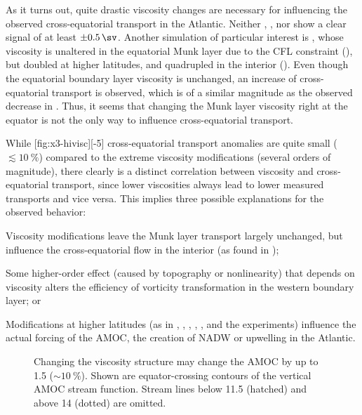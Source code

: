 As it turns out, quite drastic viscosity changes are necessary for influencing the observed cross-equatorial transport in the Atlantic. Neither , , nor  show a clear signal of at least \(\pm \SI{0.5}{\sv}\). Another simulation of particular interest is , whose viscosity is unaltered in the equatorial Munk layer due to the CFL constraint (\cf {}), but doubled at higher latitudes, and quadrupled in the interior (). Even though the equatorial boundary layer viscosity is unchanged, an increase of cross-equatorial transport is observed, which is of a similar magnitude as the observed decrease in \eg {}. Thus, it seems that changing the Munk layer viscosity right at the equator is not the only way to influence cross-equatorial transport.

While%
[fig:x3-hivisc]{}[-5]%
%
cross-equatorial transport anomalies are quite small (\(\lesssim \SI{10}{\percent}\)) compared to the extreme viscosity modifications (several orders of magnitude), there clearly is a distinct correlation between viscosity and cross-equatorial transport, since lower viscosities always lead to lower measured transports and vice versa. This implies three possible explanations for the observed behavior:
%
\begin{enum}
	\item Viscosity modifications leave the Munk layer transport largely unchanged, but influence the cross-equatorial flow in the interior (as found in \cite{killworth});
	\item Some higher-order effect (caused \eg by topography or nonlinearity) that depends on viscosity alters the efficiency of vorticity transformation in the western boundary layer; or
	\item Modifications at higher latitudes (as \eg in , , , , , and the  experiments) influence the actual forcing of the \ac{AMOC}, \eg the creation of \ac{NADW} or upwelling in the Atlantic.
\end{enum}

\begin{figure}
	\begin{whole}
	\end{whole}
	\caption[Equator-crossing contours of the vertical \ac{AMOC} stream function.]{Changing the viscosity structure may change the \ac{AMOC} by up to \SI{1.5}{\sv} (\(\sim \SI{10}{\percent}\)). Shown are equator-crossing contours of the vertical \ac{AMOC} stream function. Stream lines below \SI{11.5}{\sv} (hatched) and above \SI{14}{\sv} (dotted) are omitted.}
	\label{fig:amoc-comp}
\end{figure}


